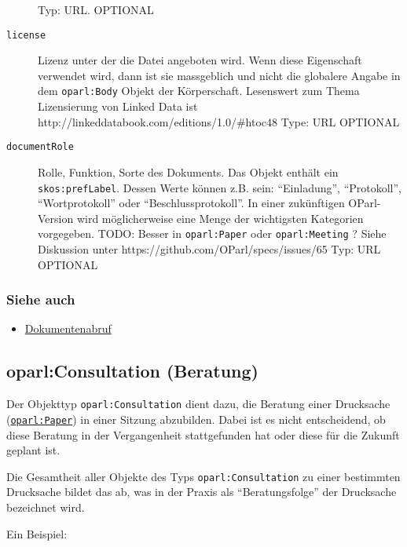 \documentclass[,a4paper]{article}
\begin{document}
\begin{description}
Typ: URL. OPTIONAL
\item[\texttt{license}]
Lizenz unter der die Datei angeboten wird. Wenn diese Eigenschaft
verwendet wird, dann ist sie massgeblich und nicht die globalere Angabe
in dem \texttt{oparl:Body} Objekt der Körperschaft. Lesenswert zum Thema
Lizensierung von Linked Data ist
http://linkeddatabook.com/editions/1.0/\#htoc48 Type: URL OPTIONAL
\item[\texttt{documentRole}]
Rolle, Funktion, Sorte des Dokuments. Das Objekt enthält ein
\texttt{skos:prefLabel}. Dessen Werte können z.B. sein: ``Einladung'',
``Protokoll'', ``Wortprotokoll'' oder ``Beschlussprotokoll''. In einer
zukünftigen OParl-Version wird möglicherweise eine Menge der wichtigsten
Kategorien vorgegeben. TODO: Besser in \texttt{oparl:Paper} oder
\texttt{oparl:Meeting} ? Siehe Diskussion unter
https://github.com/OParl/specs/issues/65 Typ: URL OPTIONAL
\end{description}

\subsubsection{Siehe auch}\label{siehe-auch}

\begin{itemize}
\itemsep1pt\parskip0pt
\item
  \hyperref[dokumentenabruf]{Dokumentenabruf}
\end{itemize}

\subsection{oparl:Consultation (Beratung)}\label{oparlux5fconsultation}

Der Objekttyp \texttt{oparl:Consultation} dient dazu, die Beratung einer
Drucksache (\hyperref[oparlux5fpaper]{\texttt{oparl:Paper}}) in einer
Sitzung abzubilden. Dabei ist es nicht entscheidend, ob diese Beratung
in der Vergangenheit stattgefunden hat oder diese für die Zukunft
geplant ist.

Die Gesamtheit aller Objekte des Typs \texttt{oparl:Consultation} zu
einer bestimmten Drucksache bildet das ab, was in der Praxis als
``Beratungsfolge'' der Drucksache bezeichnet wird.

Ein Beispiel:
\end{document}
